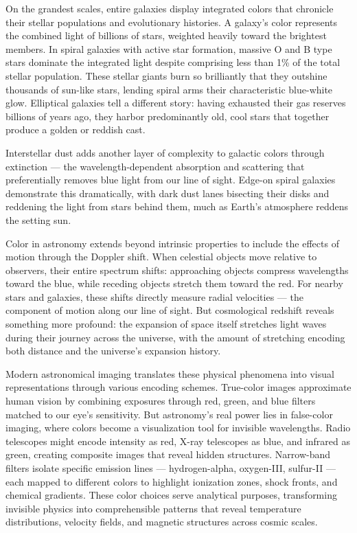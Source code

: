 On the grandest scales, entire galaxies display integrated colors that chronicle their stellar populations and evolutionary histories. A galaxy's color represents the combined light of billions of stars, weighted heavily toward the brightest members. In spiral galaxies with active star formation, massive O and B type stars dominate the integrated light despite comprising less than 1\% of the total stellar population. These stellar giants burn so brilliantly that they outshine thousands of sun-like stars, lending spiral arms their characteristic blue-white glow. Elliptical galaxies tell a different story: having exhausted their gas reserves billions of years ago, they harbor predominantly old, cool stars that together produce a golden or reddish cast.

Interstellar dust adds another layer of complexity to galactic colors through extinction — the wavelength-dependent absorption and scattering that preferentially removes blue light from our line of sight. Edge-on spiral galaxies demonstrate this dramatically, with dark dust lanes bisecting their disks and reddening the light from stars behind them, much as Earth's atmosphere reddens the setting sun.

Color in astronomy extends beyond intrinsic properties to include the effects of motion through the Doppler shift. When celestial objects move relative to observers, their entire spectrum shifts: approaching objects compress wavelengths toward the blue, while receding objects stretch them toward the red. For nearby stars and galaxies, these shifts directly measure radial velocities — the component of motion along our line of sight. But cosmological redshift reveals something more profound: the expansion of space itself stretches light waves during their journey across the universe, with the amount of stretching encoding both distance and the universe's expansion history.

Modern astronomical imaging translates these physical phenomena into visual representations through various encoding schemes. True-color images approximate human vision by combining exposures through red, green, and blue filters matched to our eye's sensitivity. But astronomy's real power lies in false-color imaging, where colors become a visualization tool for invisible wavelengths. Radio telescopes might encode intensity as red, X-ray telescopes as blue, and infrared as green, creating composite images that reveal hidden structures. Narrow-band filters isolate specific emission lines — hydrogen-alpha, oxygen-III, sulfur-II — each mapped to different colors to highlight ionization zones, shock fronts, and chemical gradients. These color choices serve analytical purposes, transforming invisible physics into comprehensible patterns that reveal temperature distributions, velocity fields, and magnetic structures across cosmic scales.


